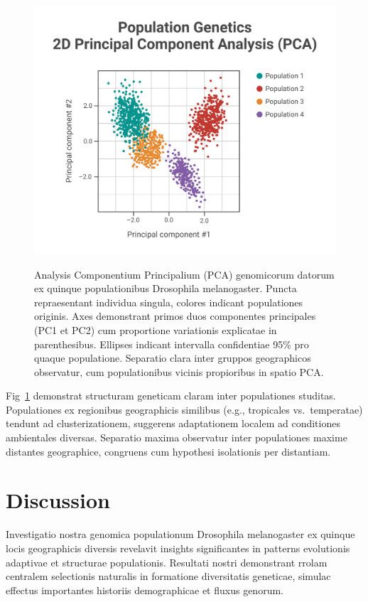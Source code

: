 \documentclass[
]{article}
\begin{document}
\begin{figure}
\centering
\includegraphics[width=\linewidth,height=10cm,keepaspectratio]{./figures/placeholder_image.png}
\caption{Analysis Componentium Principalium (PCA) genomicorum datorum ex
quinque populationibus Drosophila melanogaster. Puncta repraesentant
individua singula, colores indicant populationes originis. Axes
demonstrant primos duos componentes principales (PC1 et PC2) cum
proportione variationis explicatae in parenthesibus. Ellipses indicant
intervalla confidentiae 95\% pro quaque populatione. Separatio clara
inter gruppos geographicos observatur, cum populationibus vicinis
propioribus in spatio PCA.}\label{fig:pca}
\end{figure}

Fig~\ref{fig:pca} demonstrat structuram geneticam claram inter
populationes studitas. Populationes ex regionibus geographicis similibus
(e.g., tropicales vs.~temperatae) tendunt ad clusterizationem, suggerens
adaptationem localem ad conditiones ambientales diversas. Separatio
maxima observatur inter populationes maxime distantes geographice,
congruens cum hypothesi isolationis per distantiam.

\section{Discussion}\label{discussion}

Investigatio nostra genomica populationum Drosophila melanogaster ex
quinque locis geographicis diversis revelavit insights significantes in
patterns evolutionis adaptivae et structurae populationis. Resultati
nostri demonstrant rrolam centralem selectionis naturalis in formatione
diversitatis geneticae, simulac effectus importantes historiis
demographicae et fluxus genorum.
\end{document}
